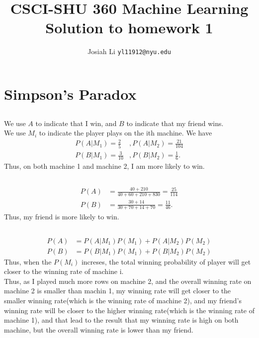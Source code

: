 \documentclass{article}
\title{CSCI-SHU 360 Machine Learning\\
    Solution to homework 1}
\author{Josiah Li \texttt{yl11912@nyu.edu}}
\begin{document}
    \maketitle
\section{Simpson's Paradox}\label{sec:Simpson's Paradox} %

\subsection{} %
We use $ A $ to indicate that I win, and $ B $ to indicate that my friend wins.\\
We use $ M_i $ to indicate the player plays on the ith machine.
We have 
\begin{align*}
    P(A|M_1) = \frac{2}{5}&, P(A|M_2) = \frac{21}{104}\\
    P(B|M_1) = \frac{3}{10 }&, P(B|M_2) = \frac{1}{6}.
\end{align*}
Thus, on both machine 1 and machine 2, I am more likely to win.

\subsection{}
\begin{align*}
    P(A) &= \frac{40 + 210}{40 + 60 + 210 + 830} = \frac{25}{114} \\
    P(B) &= \frac{30 + 14}{30 + 70 + 14 + 70} = \frac{11 }{46}.
\end{align*}
Thus, my friend is more likely to win.

\subsection{} %
\begin{align*}
    P(A) &= P(A|M_1)P(M_1) + P(A|M_2)P(M_2) \\ 
    P(B) &= P(B|M_1)P(M_1) + P(B|M_2)P(M_2)
\end{align*}
Thus, when the $ P(M_i) $ increses, the total winning probability of player will get closer to the winning rate of machine i. \\ 
Thus, as I played much more rows on machine 2, and the overall winning rate on machine 2 is smaller than machin 1, my winning rate will get closer to the smaller winning rate(which is the winning rate of machine 2), and my friend's winning rate will be closer to the higher winning rate(which is the winning rate of machine 1), and that lead to the result that my winning rate is high on both machine, but the overall winning rate is lower than my friend.
\end{document}
